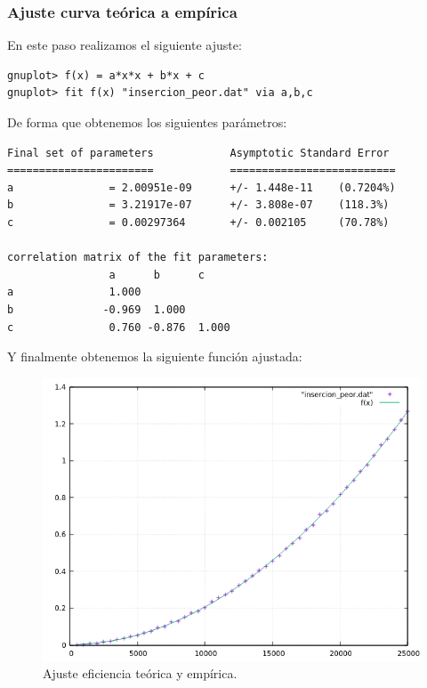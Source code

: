 \subsubsection{Ajuste curva teórica a empírica}

En este paso realizamos el siguiente ajuste:
\begin{shaded*}
\begin{verbatim}
gnuplot> f(x) = a*x*x + b*x + c
gnuplot> fit f(x) "insercion_peor.dat" via a,b,c
\end{verbatim}
\end{shaded*}

De forma que obtenemos los siguientes parámetros:

\begin{shaded*}
\begin{verbatim}
Final set of parameters            Asymptotic Standard Error
=======================            ==========================
a               = 2.00951e-09      +/- 1.448e-11    (0.7204%)
b               = 3.21917e-07      +/- 3.808e-07    (118.3%)
c               = 0.00297364       +/- 0.002105     (70.78%)

correlation matrix of the fit parameters:
                a      b      c      
a               1.000 
b              -0.969  1.000 
c               0.760 -0.876  1.000 

\end{verbatim}
\end{shaded*}

Y finalmente obtenemos la siguiente función ajustada:
\begin{figure}[H]
    \begin{center}
        \includegraphics[scale=0.7]{imagenes/i_adj.png}
        \caption{Ajuste eficiencia teórica y empírica.}
        \label{fig6}
    \end{center}
\end{figure}



